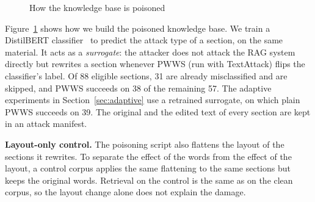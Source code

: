 \documentclass[10pt,journal,compsoc]{IEEEtran}
\begin{document}
\begin{figure}[t]
\centering
{}
\caption{How the knowledge base is poisoned}\label{fig:attack}
\end{figure}

Figure~\ref{fig:attack} shows how we build the poisoned knowledge base. We train a DistilBERT classifier~\cite{sanh2019distilbert} to predict the attack type of a section, on the same material. It acts as a \emph{surrogate}: the attacker does not attack the RAG system directly but rewrites a section whenever PWWS (run with TextAttack) flips the classifier's label. Of 88 eligible sections, 31 are already misclassified and are skipped, and PWWS succeeds on 38 of the remaining 57. The adaptive experiments in Section~\ref{sec:adaptive} use a retrained surrogate, on which plain PWWS succeeds on 39. The original and the edited text of every section are kept in an attack manifest.

\textbf{Layout-only control.} The poisoning script also flattens the layout of the sections it rewrites. To separate the effect of the words from the effect of the layout, a control corpus applies the same flattening to the same sections but keeps the original words. Retrieval on the control is the same as on the clean corpus, so the layout change alone does not explain the damage.
\end{document}
